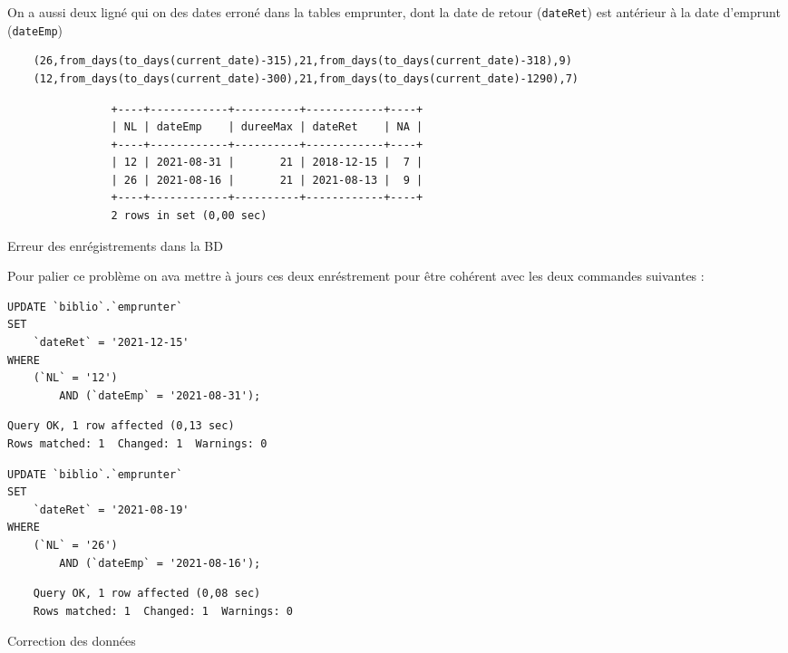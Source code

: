 \documentclass{article}
\begin{document}
On a aussi deux ligné qui on des dates erroné dans la tables emprunter, dont la date de retour (\texttt{dateRet}) est antérieur  à la
date d'emprunt (\texttt{dateEmp})
\begin{listing}[H]
\begin{verbatim}
    (26,from_days(to_days(current_date)-315),21,from_days(to_days(current_date)-318),9)
    (12,from_days(to_days(current_date)-300),21,from_days(to_days(current_date)-1290),7)
\end{verbatim}
\begin{verbatim}
                +----+------------+----------+------------+----+
                | NL | dateEmp    | dureeMax | dateRet    | NA |
                +----+------------+----------+------------+----+
                | 12 | 2021-08-31 |       21 | 2018-12-15 |  7 |
                | 26 | 2021-08-16 |       21 | 2021-08-13 |  9 |
                +----+------------+----------+------------+----+
                2 rows in set (0,00 sec)
\end{verbatim}
\caption{Erreur des enrégistrements dans la BD}
\end{listing}
Pour palier ce problème on ava mettre à jours ces deux enréstrement pour être cohérent avec les deux commandes suivantes :
\begin{center}
\begin{minipage}{0.5\linewidth}
\begin{listing}[H]
\begin{verbatim}
UPDATE `biblio`.`emprunter` 
SET 
    `dateRet` = '2021-12-15'
WHERE
    (`NL` = '12')
        AND (`dateEmp` = '2021-08-31');
\end{verbatim}
\begin{verbatim}
Query OK, 1 row affected (0,13 sec)
Rows matched: 1  Changed: 1  Warnings: 0    
\end{verbatim}
\begin{verbatim}
UPDATE `biblio`.`emprunter` 
SET 
    `dateRet` = '2021-08-19'
WHERE
    (`NL` = '26')
        AND (`dateEmp` = '2021-08-16');    
\end{verbatim}
\begin{verbatim}
    Query OK, 1 row affected (0,08 sec)
    Rows matched: 1  Changed: 1  Warnings: 0    
\end{verbatim}    
\caption{Correction des données}
\end{listing}
\end{minipage}
\end{center}
\end{document}
